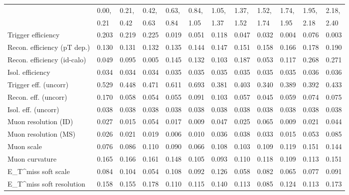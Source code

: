 \begin{tabular}{l|p{0.6cm}p{0.6cm}p{0.6cm}p{0.6cm}p{0.6cm}p{0.6cm}p{0.6cm}p{0.6cm}p{0.6cm}p{0.6cm}p{0.6cm}}
\hline
   & 0.00, & 0.21, & 0.42, & 0.63, & 0.84, & 1.05, & 1.37, & 1.52, & 1.74, & 1.95, & 2.18,  \\ 
   & 0.21 & 0.42 & 0.63 & 0.84 & 1.05 & 1.37 & 1.52 & 1.74 & 1.95 & 2.18 & 2.40  \\ 
\hline
Trigger efficiency                       & 0.203 & 0.219 & 0.225 & 0.019 & 0.051 & 0.118 & 0.047 & 0.032 & 0.004 & 0.076 & 0.003 \\
Recon. efficiency (pT dep.)              & 0.130 & 0.131 & 0.132 & 0.135 & 0.144 & 0.147 & 0.151 & 0.158 & 0.166 & 0.178 & 0.190 \\
Recon. efficiency (id-calo)              & 0.049 & 0.095 & 0.005 & 0.145 & 0.132 & 0.103 & 0.187 & 0.053 & 0.117 & 0.268 & 0.271 \\
Isol. efficiency                         & 0.034 & 0.034 & 0.034 & 0.035 & 0.035 & 0.035 & 0.035 & 0.035 & 0.035 & 0.036 & 0.036 \\
Trigger eff. (uncorr)                    & 0.529 & 0.448 & 0.471 & 0.611 & 0.693 & 0.381 & 0.403 & 0.340 & 0.389 & 0.392 & 0.433 \\
Recon. eff. (uncorr)                     & 0.170 & 0.058 & 0.054 & 0.055 & 0.091 & 0.103 & 0.057 & 0.045 & 0.059 & 0.074 & 0.075 \\
Isol. eff. (uncorr)                      & 0.038 & 0.038 & 0.038 & 0.038 & 0.038 & 0.038 & 0.038 & 0.038 & 0.038 & 0.038 & 0.038 \\
Muon resolution (ID)                     & 0.027 & 0.015 & 0.054 & 0.017 & 0.009 & 0.047 & 0.025 & 0.065 & 0.009 & 0.021 & 0.044 \\
Muon resolution (MS)                     & 0.026 & 0.021 & 0.019 & 0.006 & 0.010 & 0.036 & 0.038 & 0.033 & 0.015 & 0.053 & 0.085 \\
Muon scale                               & 0.076 & 0.086 & 0.110 & 0.090 & 0.066 & 0.108 & 0.103 & 0.109 & 0.119 & 0.151 & 0.144 \\
Muon curvature                           & 0.165 & 0.166 & 0.161 & 0.148 & 0.105 & 0.093 & 0.110 & 0.118 & 0.109 & 0.113 & 0.151 \\
E_{T}^{miss} soft scale                  & 0.084 & 0.104 & 0.054 & 0.108 & 0.092 & 0.126 & 0.058 & 0.082 & 0.065 & 0.077 & 0.091 \\
E_{T}^{miss} soft resolution             & 0.158 & 0.155 & 0.178 & 0.110 & 0.115 & 0.140 & 0.113 & 0.085 & 0.124 & 0.113 & 0.173 \\

\end{tabular}
